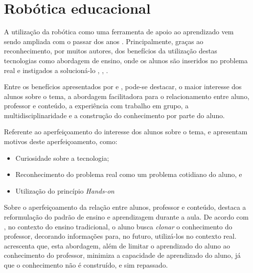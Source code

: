 \section{Robótica educacional} %
\label{sec:robótica_educacional}

A utilização da robótica como uma ferramenta de apoio ao aprendizado vem sendo ampliada com o passar dos anos \cite{teachingWithRoboticKit}. Principalmente, graças ao reconhecimento, por muitos autores, dos benefícios da utilização destas tecnologias como abordagem de ensino, onde os alunos são inseridos no problema real e instigados a solucioná-lo \cite{teachingWithRoboticKit}, \cite{construcionismoPapert}, \cite{roboticaEducativaEnsinoMedio}.

Entre os benefícios apresentados por \cite{daMaquinaDeEnsinarAMaquinaDeAprender} e \cite{PCsEConstrucionismo}, pode-se destacar, o maior interesse dos alunos sobre o tema, a abordagem facilitadora para o relacionamento entre aluno, professor e conteúdo, a experiência com trabalho em grupo, a multidisciplinaridade e a construção do conhecimento por parte do aluno.

Referente ao aperfeiçoamento do interesse dos alunos sobre o tema, \cite{construcionismoPapert} e \cite{teachingWithRoboticKit} apresentam motivos deste aperfeiçoamento, como:
\begin{itemize}
	\item Curiosidade sobre a tecnologia;

	\item Reconhecimento do problema real como um problema cotidiano do aluno, e

	\item Utilização do princípio \textit{Hands-on} \cite{PCsEConstrucionismo}
\end{itemize}

Sobre o aperfeiçoamento da relação entre alunos, professor e conteúdo, \cite{construcionismoPapert} destaca a reformulação do padrão de ensino e aprendizagem durante a aula. De acordo com \cite{construcionismoPapert}, no contexto do ensino tradicional, o aluno busca \textit{clonar} o conhecimento do professor, decorando informações para, no futuro, utilizá-los no contexto real. \cite{roboticaEducativaEnsinoMedio} acrescenta que, esta abordagem, além de limitar o aprendizado do aluno ao conhecimento do professor, minimiza a capacidade de aprendizado do aluno, já que o conhecimento não é construído, e sim repassado.

